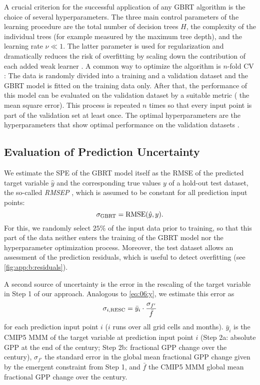 A crucial criterion for the successful application of any \ac{GBRT} algorithm
is the choice of several hyperparameters. The three main control parameters of
the learning procedure are the total number of decision trees $H$, the
complexity of the individual trees (for example measured by the maximum tree
depth), and the learning rate $\nu \ll 1$. The latter parameter is used for
regularization and dramatically reduces the risk of overfitting by scaling down
the contribution of each added weak learner \autocite{Death2007, Elith2008,
  Friedman2001}. A common way to optimize the algorithm is $n$-fold \acf{CV}
\autocite{Bishop2006}: The data is randomly divided into a training and a
validation dataset and the \acs{GBRT} model is fitted on the training data
only. After that, the performance of this model can be evaluated on the
validation dataset by a suitable metric (\eg{} the mean square error). This
process is repeated $n$ times so that every input point is part of the
validation set at least once. The optimal hyperparameters are the
hyperparameters that show optimal performance on the validation datasets
\autocite{Elith2008}.


\subsection{Evaluation of Prediction Uncertainty}
\label{subsec:app:b:uncertainty}

We estimate the \acf{SPE} of the \ac{GBRT} model itself as the \ac{RMSE} of the
predicted target variable $\hat{y}$ and the corresponding true values $y$ of a
hold-out test dataset, the so-called \emph{\acf{RMSEP}} \autocite{Bishop2006},
which is assumed to be constant for all prediction input points:
\begin{equation}
  \sigma_{\textnormal{GBRT}} = \textnormal{RMSE}(\hat{y}, y).
  \label{eq:app:b:sigma_gbrt}
\end{equation}
For this, we randomly select $25 \unit{\%}$ of the input data prior to
training, so that this part of the data neither enters the training of the
\ac{GBRT} model nor the hyperparameter optimization process. Moreover, the test
dataset allows an assessment of the prediction residuals, which is useful to
detect overfitting (see \cref{fig:app:b:residuals}).

A second source of uncertainty is the error in the rescaling of the target
variable in Step 1 of our approach. Analogous to \cref{eq:06:y}, we estimate
this error as
\begin{equation}
  \sigma_{i, \textnormal{RESC}} = \bar{y}_i \cdot \frac{\sigma_{f'}}{\bar{f}}
  \label{eq:app:b:sigma_rescaling}
\end{equation}
for each prediction input point $i$ ($i$ runs over all grid cells and months).
$\bar{y}_i$ is the \acs{CMIP}5 \acf{MMM} of the target variable at prediction
input point $i$ (Step 2a: absolute \ac{GPP} at the end of the  century;
Step 2b: fractional \ac{GPP} change over the  century), $\sigma_{f'}$
the standard error in the global mean fractional \acs{GPP} change given by the
emergent constraint from Step 1, and $\bar{f}$ the \acs{CMIP}5 \ac{MMM} global
mean fractional \ac{GPP} change over the  century.

